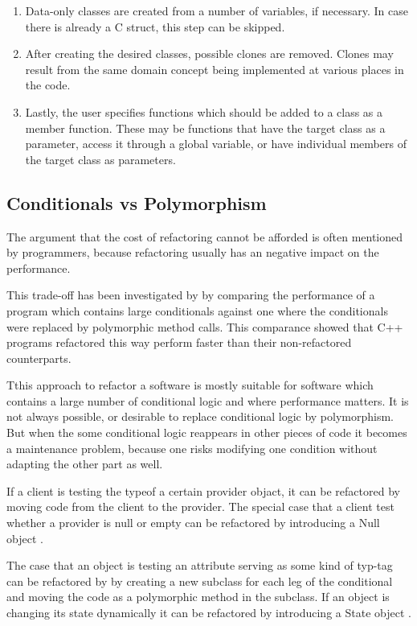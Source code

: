 \documentclass[conference,compsoc,a4paper]{IEEEtran}
\newcommand{\code}[1]{{\small\ttfamily #1}}
\begin{document}
\begin{enumerate}
  \item Data-only classes are created from a number of variables, if necessary. In case there is already a C 
  \code{struct}, this step can be skipped.
  
  \item After creating the desired classes, possible clones are removed. Clones may result from the same domain concept 
  being implemented at various places in the code.
  
  \item Lastly, the user specifies functions which should be added to a class as a member function. These may be 
  functions that have the target class as a parameter, access it through a global variable, or have individual members 
  of the target class as parameters.
\end{enumerate}

\subsection{Conditionals vs Polymorphism}

The argument that the cost of refactoring cannot be afforded is often mentioned by programmers, because refactoring usually has an negative impact on the performance.

This trade-off has been investigated by \cite{Demeyer2002} by comparing the performance of a program which contains large conditionals against one where the conditionals were replaced by polymorphic method calls. This comparance showed that C++ programs refactored this way perform faster than their non-refactored counterparts.

Tthis approach to refactor a software is mostly suitable for software which contains a large number of conditional logic and where performance matters. It is not always possible, or desirable to replace conditional logic by polymorphism. But when the some conditional logic reappears in other pieces of code it becomes a maintenance problem, because one risks modifying one condition without adapting the other part as well. 

If a client is testing the typeof a certain provider objact, it can be refactored by moving code from the client to the provider. The special case that a client test whether a provider is null or empty can be refactored by introducing a Null object \cite{nullobject}.

The case that an object is testing an attribute serving as some kind of typ-tag can be refactored by by creating a new subclass for each leg of the conditional
and moving the code as a polymorphic method in the subclass. If an object is changing its state dynamically it can be refactored by introducing a State object \cite{designpatter}.
\end{document}
